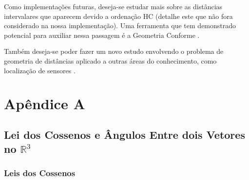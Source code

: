 \documentclass[a4paper,12pt]{article}
\begin{document}
	Como implementações futuras, deseja-se estudar mais sobre as distâncias intervalares que aparecem devido a ordenação HC \cite{carlile:MinimalOrder} (detalhe este que não fora considerado na nossa implementação). Uma ferramenta que tem demonstrado potencial para auxiliar nessa passagem é a Geometria Conforme \cite{carlileBook31Coloquio}.
	
	Também deseja-se poder fazer um novo estudo envolvendo o problema de geometria de distâncias aplicado a outras áreas do conhecimento, como localização de sensores \cite{carlileGDandAplications}. 
	
	\newpage
	
	
	
	
	
	\newpage
	
	\section*{Apêndice A}
	\subsection*{Lei dos Cossenos e Ângulos Entre dois Vetores no $\mathbb{R}^3$}
	
	\subsubsection*{Leis dos Cossenos}
\end{document}
